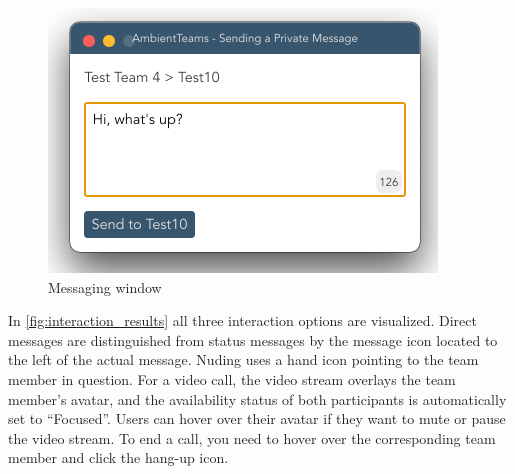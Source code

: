 \begin{figure}[h]
    \centering
    \includegraphics[width=.4\linewidth]{./images/messaging_window.png}
    \caption{Messaging window }
    \label{fig:messaging_window}
\end{figure}

In \autoref{fig:interaction_results} all three interaction options are visualized. Direct messages are distinguished from status messages by the message icon located to the left of the actual message. Nuding uses a hand icon pointing to the team member in question. For a video call, the video stream overlays the team member's avatar, and the availability status of both participants is automatically set to \enquote{Focused}. Users can hover over their avatar if they want to mute or pause the video stream. To end a call, you need to hover over the corresponding team member and click the hang-up icon.

